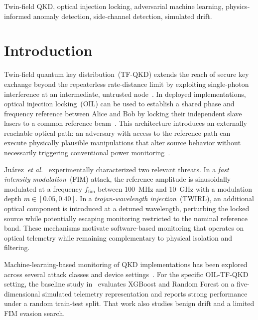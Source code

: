 \documentclass[journal,twocolumn]{IEEEtran}
\begin{document}
\begin{IEEEkeywords}
Twin-field QKD, optical injection locking, adversarial machine learning,
physics-informed anomaly detection, side-channel detection, simulated drift.
\end{IEEEkeywords}

\section{Introduction}
\label{sec:intro}

Twin-field quantum key distribution~(TF-QKD) extends the reach of secure key
exchange beyond the repeaterless rate-distance limit by exploiting single-photon
interference at an intermediate, untrusted node~\cite{lucamarini2018,wang2018}.
In deployed implementations, optical injection locking~(OIL) can be used to
establish a shared phase and frequency reference between Alice and Bob by locking
their independent slave lasers to a common reference beam~\cite{pirandola2020,
roberts2017}. This architecture introduces an externally reachable optical path:
an adversary with access to the reference path can execute physically plausible
manipulations that alter source behavior without necessarily triggering conventional
power monitoring~\cite{juarez2026}.

Juárez~\emph{et al.}~\cite{juarez2026} experimentally characterized two relevant
threats. In a \emph{fast intensity modulation}~(FIM) attack, the reference amplitude
is sinusoidally modulated at a frequency $f_\mathrm{fim}$ between
\SI{100}{\mega\hertz} and \SI{10}{\giga\hertz} with a modulation depth
$m \in [0.05, 0.40]$. In a \emph{trojan-wavelength injection}~(TWIRL), an additional
optical component is introduced at a detuned wavelength, perturbing the locked
source while potentially escaping monitoring restricted to the nominal reference
band. These mechanisms motivate software-based monitoring that operates on optical
telemetry while remaining complementary to physical isolation and filtering.

Machine-learning-based monitoring of QKD implementations has been explored across
several attack classes and device settings~\cite{baliuka2023,almohammed2021,tunc2023,
du2022,luo2022,ding2023mads,xu2024mlqkd,liu2025}. For the specific OIL-TF-QKD setting,
the baseline study in~\cite{basepaper} evaluates XGBoost and Random Forest on a
five-dimensional simulated telemetry representation and reports strong performance
under a random train-test split. That work also studies benign drift and a limited
FIM evasion search.
\end{document}
